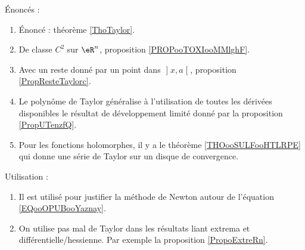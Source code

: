 

Énoncés :

    \begin{enumerate}
    \item
        Énoncé : théorème \ref{ThoTaylor}.
    \item
        De classe \( C^2\) sur \( \eR^n\), proposition \ref{PROPooTOXIooMMlghF}.
    \item
    Avec un reste donné par un point dans \( \mathopen] x , a \mathclose[\), proposition \ref{PropResteTaylorc}.

        \item
            Le polynôme de Taylor généralise à l'utilisation de toutes les dérivées disponibles le résultat de développement limité donné par la proposition \ref{PropUTenzfQ}.
        \item
            Pour les fonctions holomorphes, il y a le théorème \ref{THOooSULFooHTLRPE} qui donne une série de Taylor sur un disque de convergence.
        \end{enumerate}

Utilisation :
\begin{enumerate}
        \item
            Il est utilisé pour justifier la méthode de Newton autour de l'équation \eqref{EQooOPUBooYaznay}.
    \item
        On utilise pas mal de Taylor dans les résultats liant extrema et différentielle/hessienne. Par exemple la proposition \ref{PropoExtreRn}.
\end{enumerate}
